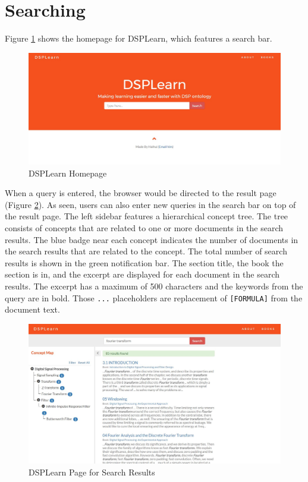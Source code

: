 \section{Searching}
Figure \ref{fig:homepage} shows the homepage for DSPLearn, which features a search bar.

\begin{figure}[!htbp]
  \centering
  \includegraphics[width=\textwidth]{system_demonstration/demo_homepage.jpg}
  \caption{DSPLearn Homepage}
  \label{fig:homepage}
\end{figure}

When a query is entered, the browser would be directed to the result page (Figure \ref{fig:result_page}). As seen, users can also enter new queries in the search bar on top of the result page. The left sidebar features a hierarchical concept tree. The tree consists of concepts that are related to one or more documents in the search results. The blue badge near each concept indicates the number of documents in the search results that are related to the concept. The total number of search results is shown in the green notification bar. The section title, the book the section is in, and the excerpt are displayed for each document in the search results. The excerpt has a maximum of 500 characters and the keywords from the query are in bold. Those \texttt{...} placeholders are replacement of \texttt{[FORMULA]} from the document text.

\begin{figure}[!htbp]
  \centering
  \includegraphics[width=\textwidth]{system_demonstration/demo_result_page.jpg}
  \caption{DSPLearn Page for Search Results}
  \label{fig:result_page}
\end{figure}

